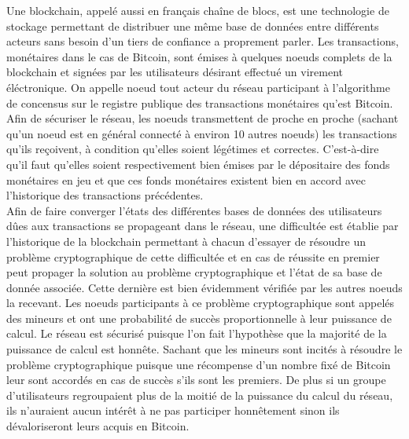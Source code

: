 \documentclass[12pt,a4paper]{article}
\begin{document}
	Une blockchain, appelé aussi en français chaîne de blocs, est une technologie de stockage permettant de distribuer une même base de données entre différents acteurs sans besoin d'un tiers de confiance a proprement parler. Les transactions, monétaires dans le cas de Bitcoin, sont émises à quelques noeuds complets de la blockchain et signées par les utilisateurs désirant effectué un virement éléctronique. On appelle noeud tout acteur du réseau participant à l'algorithme de concensus sur le registre publique des transactions monétaires qu'est Bitcoin.\\
	Afin de sécuriser le réseau, les noeuds transmettent de proche en proche (sachant qu'un noeud est en général connecté à environ 10 autres noeuds) les transactions qu'ils reçoivent, à condition qu'elles soient légétimes et correctes. C'est-à-dire qu'il faut qu'elles soient respectivement bien émises par le dépositaire des fonds monétaires en jeu et que ces fonds monétaires existent bien en accord avec l'historique des transactions précédentes.\\
	Afin de faire converger l'états des différentes bases de données des utilisateurs dûes aux transactions se propageant dans le réseau, une difficultée est établie par l'historique de la blockchain permettant à chacun d'essayer de résoudre un problème cryptographique de cette difficultée et en cas de réussite en premier peut propager la solution au problème cryptographique et l'état de sa base de donnée associée. Cette dernière est bien évidemment vérifiée par les autres noeuds la recevant. Les noeuds participants à ce problème cryptographique sont appelés des mineurs et ont une probabilité de succès proportionnelle à leur puissance de calcul. Le réseau est sécurisé puisque l'on fait l'hypothèse que la majorité de la puissance de calcul est honnête. Sachant que les mineurs sont incités à résoudre le problème cryptographique puisque une récompense d'un nombre fixé de Bitcoin leur sont accordés en cas de succès s'ils sont les premiers. De plus si un groupe d'utilisateurs regroupaient plus de la moitié de la puissance du calcul du réseau, ils n'auraient aucun intérêt à ne pas participer honnêtement sinon ils dévaloriseront leurs acquis en Bitcoin.\\%
\end{document}
